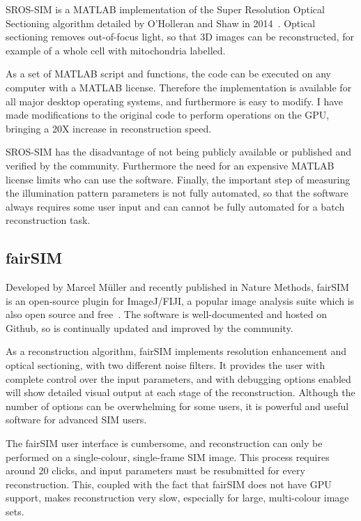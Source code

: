 SROS-SIM is a MATLAB implementation of the Super Resolution Optical Sectioning algorithm detailed by O'Holleran and Shaw in 2014~\cite{oholleran2014optimized}. 
Optical sectioning removes out-of-focus light, so that 3D images can be reconstructed, for example of a whole cell with mitochondria labelled.

As a set of MATLAB script and functions, the code can be executed on any computer with a MATLAB license.
Therefore the implementation is available for all major desktop operating systems, and furthermore is easy to modify.
I have made modifications to the original code to perform operations on the GPU, bringing a 20X increase in reconstruction speed. 

SROS-SIM has the disadvantage of not being publicly available or published and verified by the community.
Furthermore the need for an expensive MATLAB license limits who can use the software. 
Finally, the important step of measuring the illumination pattern parameters is not fully automated, so that the software always requires some user input and can cannot be fully automated for a batch reconstruction task.

\subsection{fairSIM}
Developed by Marcel M\"uller and recently published in Nature Methods, fairSIM is an open-source plugin for ImageJ/FIJI, a popular image analysis suite which is also open source and free~\cite{muller2016open}. 
The software is well-documented and hosted on Github, so is continually updated and improved by the community. 

As a reconstruction algorithm, fairSIM implements resolution enhancement and optical sectioning, with two different noise filters. 
It provides the user with complete control over the input parameters, and with debugging options enabled will show detailed visual output at each stage of the reconstruction. 
Although the number of options can be overwhelming for some users, it is powerful and useful software for advanced SIM users. 

The fairSIM user interface is cumbersome, and reconstruction can only be performed on a single-colour, single-frame SIM image. 
This process requires around 20 clicks, and input parameters must be resubmitted for every reconstruction. 
This, coupled with the fact that fairSIM does not have GPU support, makes reconstruction very slow, especially for large, multi-colour image sets. 

